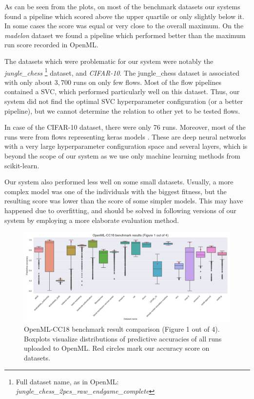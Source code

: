 As can be seen from the plots, on most of the benchmark datasets our systems
found a pipeline which scored above the upper quartile or only slightly below
it. In some cases the score was equal or very close to the overall maximum. On
the \emph{madelon} dataset we found a pipeline which performed better than the
maximum run score recorded in OpenML.

The datasets which were problematic for our system were notably the
\emph{jungle\_chess} \footnote{Full dataset name, as in OpenML:
\emph{jungle\_chess\_2pcs\_raw\_endgame\_complete}} dataset, 
and \emph{CIFAR-10}. The jungle\_chess dataset is associated with only
about $3,700$ runs on only few flows. Most of the flow pipelines contained a
SVC, which performed particularly well on this dataset. Thus, our system did
not find the optimal SVC hyperparameter configuration (or a better pipeline),
but we cannot determine the relation to other yet to be tested flows.

In case of the CIFAR-10 dataset, there were only 76 runs. Moreover, most of the
runs were from flows representing keras models \citep{chollet2015keras}. These
are deep neural networks with a very large hyperparameter configuration space
and several layers, which is beyond the scope of our system as we use only
machine learning methods from scikit-learn.

Our system also performed less well on some small datasets. Usually, a more
complex model was one of the individuals with the biggest fitness, but the
resulting score was lower than the score of some simpler models. This may have
happened due to overfitting, and should be solved in following versions of our
system by employing a more elaborate evaluation method.


\begin{figure}
    \includegraphics[width=\textwidth]{../img/openml-boxplot0.png}
    \caption[OpenML-CC18 benchmark result compad rison (Figure 1 out of 4)]{
    OpenML-CC18 benchmark result comparison (Figure 1 out of 4).
    Boxplots visualize distributions of predictive accuracies of all
    runs uploaded to OpenML. Red circles mark our accuracy score on datasets.}
    \label{fig:OpenML:boxplot:0}
\end{figure}

